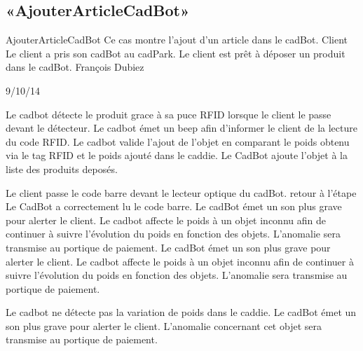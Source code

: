 \subsection{«AjouterArticleCadBot»}

\startCU
\nom AjouterArticleCadBot
\but Ce cas montre l'ajout d'un article dans le cadBot.
\acteur Client
\precondition Le client a pris son cadBot au cadPark.
\declenchement Le client est prêt à déposer un produit dans le cadBot.
\auteur François Dubiez
\date 29/10/14

\nominal %
\startnominal
\etape[AAC:SA1] Le cadbot détecte le produit grace à sa puce RFID lorsque le client le passe devant le détecteur. 
 Le cadbot émet un beep afin d'informer le client de la lecture du code RFID.
\etape[AAC:SE1] Le cadbot valide l'ajout de l'objet en comparant le poids obtenu via le tag RFID et  le poids ajouté dans le caddie.
\stopnominal
\postcondition Le CadBot ajoute l'objet à la liste des produits deposés.

\alternatifs %
\startalternatif[AAC:SA1] %
  \etape[AAC:SE1] Le client passe le code barre devant le lecteur optique du cadBot.
  \etape retour à l'étape 
\stopcondition
\postcondition Le CadBot a correctement lu le code barre.
   \etape Le cadBot émet un son plus grave pour alerter le client.
   \etape Le cadbot affecte le poids à un objet inconnu afin de continuer à suivre l'évolution du poids en fonction des objets.
\stopcondition
\postcondition L'anomalie sera transmise au portique de paiement.
   \etape Le cadBot émet un son plus grave pour alerter le client.
   \etape Le cadbot affecte le poids à un objet inconnu afin de continuer à suivre l'évolution du poids en fonction des objets.
\stopcondition
\postcondition L'anomalie sera transmise au portique de paiement.
\stopalternatif

\startalternatif[AAC:SE1]
   \etape Le cadbot ne détecte pas la variation de poids dans le caddie.
   \etape Le cadBot émet un son plus grave pour alerter le client.
\stopcondition
\postcondition L'anomalie concernant cet objet sera transmise au portique de paiement.
\stopalternatif

\stopCU
